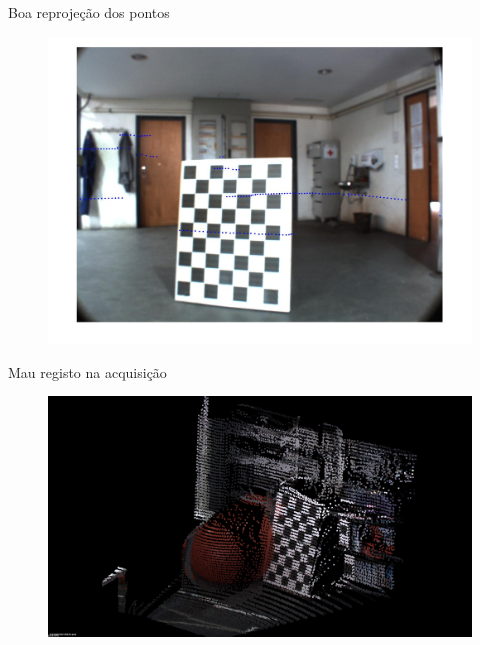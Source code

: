 \begin{frame}{Boa reprojeção dos pontos}

    \centering
    \begin{figure}
        \includegraphics[width=\textwidth]{img/radlocc_good_calibration.jpg}
    \end{figure}

\end{frame}

\begin{frame}{Mau registo na acquisição}
    
    \centering
    \begin{figure}
        \includegraphics[width=\textwidth]{img/radlocc_bad_regist.png}
    \end{figure}

\end{frame}

